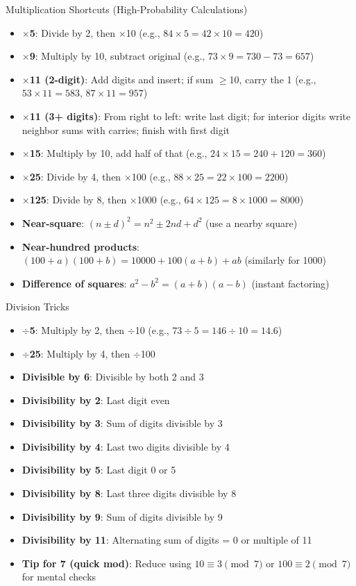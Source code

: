 \documentclass{article}
\begin{document}
\begin{mentalbox}{Multiplication Shortcuts (High-Probability Calculations)}
\begin{itemize}
\item \textbf{$\times$5}: Divide by 2, then $\times$10 (e.g., $84\times5 = 42\times10 = 420$)
\item \textbf{$\times$9}: Multiply by 10, subtract original (e.g., $73\times9 = 730-73 = 657$)
\item \textbf{$\times$11 (2-digit)}: Add digits and insert; if sum $\geq$10, carry the 1 (e.g., $53\times11 = 583$, $87\times11 = 957$)
\item \textbf{$\times$11 (3+ digits)}: From right to left: write last digit; for interior digits write neighbor sums with carries; finish with first digit
\item \textbf{$\times$15}: Multiply by 10, add half of that (e.g., $24\times15 = 240+120 = 360$)
\item \textbf{$\times$25}: Divide by 4, then $\times$100 (e.g., $88\times25 = 22\times100 = 2200$)
\item \textbf{$\times$125}: Divide by 8, then $\times$1000 (e.g., $64\times125 = 8\times1000 = 8000$)
\item \textbf{Near-square}: $(n\pm d)^2 = n^2 \pm 2nd + d^2$ (use a nearby square)
\item \textbf{Near-hundred products}: $(100+a)(100+b) = 10000 + 100(a+b) + ab$ (similarly for 1000)
\item \textbf{Difference of squares}: $a^2-b^2 = (a+b)(a-b)$ (instant factoring)
\end{itemize}
\end{mentalbox}

\begin{mentalbox}{Division Tricks}
\begin{itemize}
\item \textbf{$\div$5}: Multiply by 2, then $\div$10 (e.g., $73\div5 = 146\div10 = 14.6$)
\item \textbf{$\div$25}: Multiply by 4, then $\div$100
\item \textbf{Divisible by 6}: Divisible by both 2 and 3
\item \textbf{Divisibility by 2}: Last digit even
\item \textbf{Divisibility by 3}: Sum of digits divisible by 3
\item \textbf{Divisibility by 4}: Last two digits divisible by 4
\item \textbf{Divisibility by 5}: Last digit 0 or 5
\item \textbf{Divisibility by 8}: Last three digits divisible by 8
\item \textbf{Divisibility by 9}: Sum of digits divisible by 9
\item \textbf{Divisibility by 11}: Alternating sum of digits = 0 or multiple of 11
\item \textbf{Tip for 7 (quick mod)}: Reduce using $10\equiv3\pmod 7$ or $100\equiv2\pmod 7$ for mental checks
\end{itemize}
\end{mentalbox}
\end{document}
